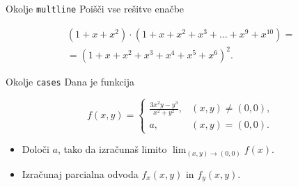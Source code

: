 \begin{frame}{Okolje \texttt{multline}}
	Poišči vse rešitve enačbe
	
	\begin{multline*}
		(1+x+x^2) \cdot (1+x+x^2+x^3+\ldots+x^9+x^{10}) = \\
		=(1+x+x^2+x^3+x^4+x^5+x^6)^2.
	\end{multline*}
\end{frame}

\begin{frame}{Okolje \texttt{cases}}
	Dana je funkcija
	
		\[
		f(x, y) =
		\begin{cases} 
		\frac{3x^2y - y^3}{x^2 + y^2}, & (x, y) \neq (0, 0), \\
		a, & (x, y) = (0, 0).
		\end{cases}
		\]
		
	\begin{itemize}
	\item Določi $a$, tako da izračunaš limito \(\lim_{(x,y)\to(0,0)} f(x). \)
	\item Izračunaj parcialna odvoda $\displaystyle f_x(x,y)$ in $\displaystyle f_y(x,y)$.
	\end{itemize}
\end{frame}

